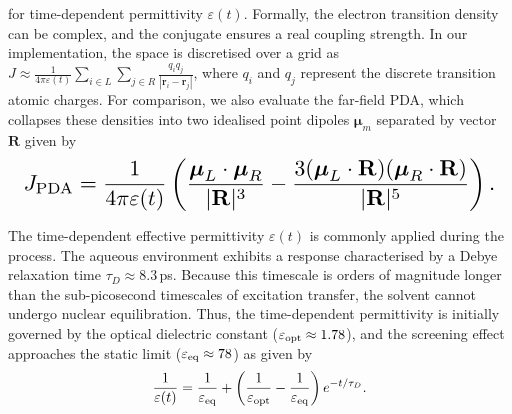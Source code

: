 \documentclass[journal=jpcbfk, manuscript=article, layout=twocolumn, doi=true]{achemso}
\begin{document}
for time-dependent permittivity $\varepsilon(t)$.
Formally, the electron transition density can be complex, and the conjugate ensures a real coupling strength. In our implementation, the space is discretised over a grid as $J \approx\frac{1}{4\pi\varepsilon(t)}\sum_{i\in L}\sum_{j\in R}\frac{q_i q_j}{|\mathbf r_i-\mathbf r_j|}$, where $q_i$ and $q_j$ represent the discrete transition atomic charges. For comparison, we also evaluate the far-field PDA, which collapses these densities into two idealised point dipoles $\boldsymbol{\mu}_m$ separated by vector $\mathbf{R}$ given by
\begin{equation} \label{eq:J_PD}
    \resizebox{.98\columnwidth}{!}{$\displaystyle
    J_{\mathrm{PDA}} = \frac{1}{4\pi\varepsilon(t)} \left( \frac{\boldsymbol{\mu}_L \cdot \boldsymbol{\mu}_R}{|\mathbf{R}|^3} - \frac{3(\boldsymbol{\mu}_L \cdot \mathbf{R})(\boldsymbol{\mu}_R \cdot \mathbf{R})}{|\mathbf{R}|^5} \right).$}
\end{equation}

The time-dependent effective permittivity $\varepsilon(t)$ is commonly applied during the process. The aqueous environment exhibits a response characterised by a Debye relaxation time $\tau_D \approx 8.3$\,ps. Because this timescale is orders of magnitude longer than the sub-picosecond timescales of excitation transfer, the solvent cannot undergo nuclear equilibration. Thus, the time-dependent permittivity is initially governed by the optical dielectric constant ($\varepsilon_{\rm opt} \approx 1.78$), and the screening effect approaches the static limit ($\varepsilon_{\rm eq} \approx 78$) as given by
\begin{equation}
    \frac{1}{\varepsilon(t)} = \frac{1}{\varepsilon_{\rm eq}} + \left(\frac{1}{\varepsilon_{\rm opt}} - \frac{1}{\varepsilon_{\rm eq}}\right)e^{-t/\tau_D}.
\end{equation}
\end{document}
